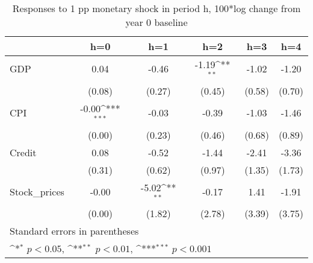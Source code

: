 \begin{table}[htbp]\centering
\def\sym#1{\ifmmode^{#1}\else\(^{#1}\)\fi}
\caption{Responses to 1 pp monetary shock in period h, 100*log change from year 0 baseline}
\begin{tabular}{l*{5}{c}}
\hline\hline
            &\multicolumn{1}{c}{h=0}&\multicolumn{1}{c}{h=1}&\multicolumn{1}{c}{h=2}&\multicolumn{1}{c}{h=3}&\multicolumn{1}{c}{h=4}\\
\hline
GDP        &        0.04         &       -0.46         &       -1.19\sym{**} &       -1.02         &       -1.20         \\
            &      (0.08)         &      (0.27)         &      (0.45)         &      (0.58)         &      (0.70)         \\
[1em]
CPI         &       -0.00\sym{***}&       -0.03         &       -0.39         &       -1.03         &       -1.46         \\
            &      (0.00)         &      (0.23)         &      (0.46)         &      (0.68)         &      (0.89)         \\
[1em]
Credit      &        0.08         &       -0.52         &       -1.44         &       -2.41         &       -3.36         \\
            &      (0.31)         &      (0.62)         &      (0.97)         &      (1.35)         &      (1.73)         \\
[1em]
Stock\_prices&       -0.00         &       -5.02\sym{**} &       -0.17         &        1.41         &       -1.91         \\
            &      (0.00)         &      (1.82)         &      (2.78)         &      (3.39)         &      (3.75)         \\
\hline\hline
\multicolumn{6}{l}{\footnotesize Standard errors in parentheses}\\
\multicolumn{6}{l}{\footnotesize \sym{*} \(p<0.05\), \sym{**} \(p<0.01\), \sym{***} \(p<0.001\)}\\
\end{tabular}
\end{table}
